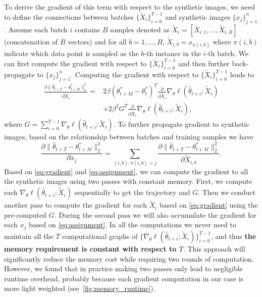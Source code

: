 \documentclass[10pt,twocolumn,letterpaper]{article}
\begin{document}
To derive the gradient of this term with respect to the synthetic images, we need to define the connections between batches $\{\tilde{X}_i\}_{i=0}^{T-1}$ and synthetic images $\{x_j\}_{j=1}^n$. Assume each batch $i$ contains $B$ samples denoted as 
$\tilde{X}_i = [\tilde{X}_{i,1}, \dots, \tilde{X}_{i, B}]$ (concatenation of $B$ vectors) and for all $b=1, \dots, B$, $\tilde{X}_{i,b}= x_{\pi(i, b)}$ where $\pi(i,b)$ indicate which data point is sampled as the $b$-th instance in the $i$-th batch. We can first compute the gradient with respect to $\{\tilde{X}_i\}_{i=0}^{T-1}$ and then further back-propagate to $\{x_j\}_{j=1}^n$. Computing the gradient with respect to $\{\tilde{X}_i\}_{i=0}^{T-1}$ leads to 
 \begin{align}
 \frac{\partial \|\hat{\theta}_{t+T}-\theta^*_{t+M}\|_2^2}{\partial \tilde{X}_i} =& 
 2\beta(\theta_{t+M}^* - \theta_t^*)^T \frac{\partial}{\partial \tilde{X}_i}\nabla_{\theta} \ell(\hat{\theta}_{t+i};\tilde{X}_i) \nonumber\\
 &+ 2\beta^2 G^T \frac{\partial}{\partial \tilde{X}_i} \nabla_{\theta} \ell(\hat{\theta}_{t+i};\tilde{X}_{i}), \label{eq:gradient} 
 \end{align}
 where $G=\sum_{i=0}^{T-1} \nabla_{\theta} \ell(\hat{\theta}_{t+i};\tilde{X}_{i})$.
 To further propagate gradient to synthetic images, based on the relationship between batches and training samples we have
 \begin{equation}
\frac{\partial \|\hat{\theta}_{t+T}-\theta^*_{t+M}\|_2^2}{\partial x_j} = \sum_{(i,b): \pi(i,b)=j} \frac{\partial \|\hat{\theta}_{t+T}-\theta^*_{t+M}\|_2^2}{\partial \tilde{X}_{i,b}}.
\label{eq:assignment}
 \end{equation}
 Based on \eqref{eq:gradient} and \eqref{eq:assignment}, we can compute the gradient to all the synthetic images using two passes with constant memory. First, we compute each $ \nabla_{\theta} \ell(\hat{\theta}_{t+i};\tilde{X}_{i})$ sequentially to get the trajectory and $G$. Then we conduct another pass to compute the gradient for each $\tilde{X}_i$ based on \eqref{eq:gradient} using the pre-computed $G$. During the second pass we will also accumulate the gradient for each $x_j$ based on \eqref{eq:assignment}. In all the computations we never need to maintain all the $T$ computational graphs of $ \{ \nabla_{\theta} \ell(\hat{\theta}_{t+i};\tilde{X}_{i})\}_{i=0}^{T-1}$, and thus {\bf the memory requirement is constant with respect to $T$}. 
This approach will significantly reduce the memory cost while requiring two rounds of computation. However, we found that in practice making two passes only lead to negligible runtime overhead, probably because each gradient computation in our case is more light weighted (see~\cref{fig:memory_runtime}). 
 
\end{document}
